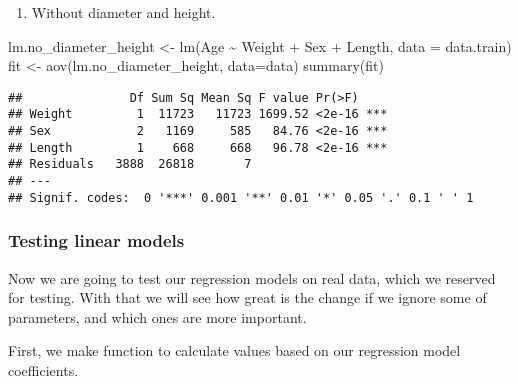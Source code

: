 \documentclass[
]{article}
\newenvironment{Shaded}{\begin{snugshade}}{\end{snugshade}}
\newcommand{\AttributeTok}[1]{\textcolor[rgb]{0.77,0.63,0.00}{#1}}
\newcommand{\FunctionTok}[1]{\textcolor[rgb]{0.00,0.00,0.00}{#1}}
\newcommand{\NormalTok}[1]{#1}
\newcommand{\OtherTok}[1]{\textcolor[rgb]{0.56,0.35,0.01}{#1}}
\newcommand{\SpecialCharTok}[1]{\textcolor[rgb]{0.00,0.00,0.00}{#1}}
\providecommand{\tightlist}{%
  \setlength{\itemsep}{0pt}\setlength{\parskip}{0pt}}
\begin{document}
\begin{enumerate}
\def\labelenumi{\arabic{enumi}.}
\setcounter{enumi}{4}
\tightlist
\item
  Without diameter and height.
\end{enumerate}

\begin{Shaded}
\begin{Highlighting}[]
\NormalTok{lm.no\_diameter\_height }\OtherTok{\textless{}{-}} \FunctionTok{lm}\NormalTok{(Age }\SpecialCharTok{\textasciitilde{}}\NormalTok{ Weight }\SpecialCharTok{+}\NormalTok{ Sex }\SpecialCharTok{+}\NormalTok{ Length, }\AttributeTok{data =}\NormalTok{ data.train)}
\NormalTok{fit }\OtherTok{\textless{}{-}} \FunctionTok{aov}\NormalTok{(lm.no\_diameter\_height, }\AttributeTok{data=}\NormalTok{data)}
\FunctionTok{summary}\NormalTok{(fit)}
\end{Highlighting}
\end{Shaded}

\begin{verbatim}
##               Df Sum Sq Mean Sq F value Pr(>F)    
## Weight         1  11723   11723 1699.52 <2e-16 ***
## Sex            2   1169     585   84.76 <2e-16 ***
## Length         1    668     668   96.78 <2e-16 ***
## Residuals   3888  26818       7                   
## ---
## Signif. codes:  0 '***' 0.001 '**' 0.01 '*' 0.05 '.' 0.1 ' ' 1
\end{verbatim}

\hypertarget{testing-linear-models}{%
\subsubsection{Testing linear models}\label{testing-linear-models}}

Now we are going to test our regression models on real data, which we
reserved for testing. With that we will see how great is the change if
we ignore some of parameters, and which ones are more important.

First, we make function to calculate values based on our regression
model coefficients.
\end{document}

